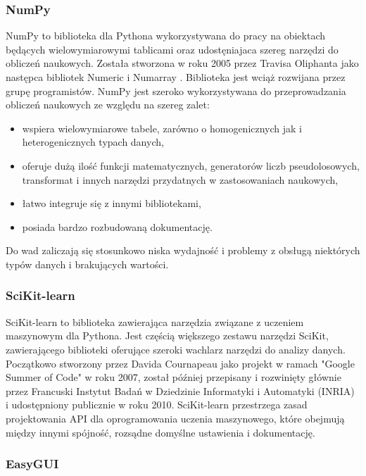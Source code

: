 \documentclass[12pt,twoside]{article}
\begin{document}
\subsubsection{NumPy}

NumPy to biblioteka dla Pythona wykorzystywana do pracy na obiektach będących wielowymiarowymi tablicami
oraz udostęniajaca szereg narzędzi do obliczeń naukowych. Została stworzona w roku 2005 przez Travisa Oliphanta
jako następca bibliotek Numeric \cite{numeric} i Numarray \cite{numarray}. Biblioteka jest wciąż rozwijana przez grupę programistów.
NumPy jest szeroko wykorzystywana do przeprowadzania obliczeń naukowych ze względu na szereg zalet: \cite{numpy2}\cite{numpy3}

\begin{itemize}[label=-,labelsep=0.4cm, leftmargin=1.25cm]
    \item wspiera wielowymiarowe tabele, zarówno o homogenicznych jak i heterogenicznych typach danych,
    \item oferuje dużą ilość funkcji matematycznych, generatorów liczb pseudolosowych, transformat i innych narzędzi
          przydatnych w zastosowaniach naukowych,
    \item łatwo integruje się z innymi bibliotekami,
    \item posiada bardzo rozbudowaną dokumentację.
\end{itemize}

Do wad zaliczają się stosunkowo niska wydajność i problemy z obsługą niektórych typów danych i brakujących wartości. \cite{numpy3}

\subsubsection{SciKit-learn}

SciKit-learn to biblioteka zawierająca narzędzia związane z uczeniem maszynowym dla Pythona.
Jest częścią większego zestawu narzędzi SciKit,
zawierającego biblioteki oferujące szeroki wachlarz narzędzi do analizy danych.
Początkowo stworzony przez Davida Cournapeau jako projekt w ramach "Google Summer of Code" w roku 2007,
został później przepisany i rozwinięty głównie przez Francuski Instytut Badań w Dziedzinie Informatyki i Automatyki (INRIA)
i udostępniony publicznie w roku 2010.
SciKit-learn przestrzega zasad projektowania API dla oprogramowania uczenia maszynowego,
które obejmują między innymi spójność, rozsądne domyślne ustawienia i dokumentację. \cite{scikit}

\subsubsection{EasyGUI}
\end{document}
